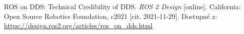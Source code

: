 \begin{thebibliography}{99}
ROS on DDS: Technical Credibility of DDS. \textit{ROS 2 Design} [online]. California: Open Source Robotics Foundation, c2021 [cit. 2021-11-29]. Dostupné z: \url{https://design.ros2.org/articles/ros\_on\_dds.html}










\end{thebibliography}


